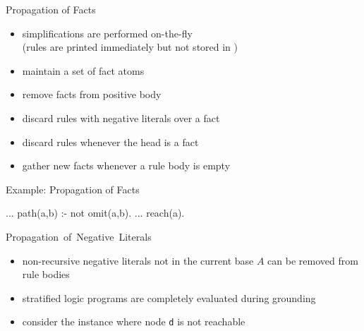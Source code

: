 \begin{frame}{Propagation of Facts}
  \vfill
  \begin{itemize}
    \item simplifications are performed \alert{on-the-fly}\\
      (rules are printed immediately but not stored in \gringo)
    \item maintain a set of \alert{fact atoms}
    \item remove facts from positive body
    \item discard rules with negative literals over a fact
    \item discard rules whenever the head is a fact
    \item gather new facts whenever a rule body is empty
  \end{itemize}
\end{frame}

\begin{frame}[fragile]{Example: Propagation of Facts}
  \vfill
  \begin{SemiVerbatim}{.9}
...
path(a,b) :- not omit(a,b).
...
reach(a). {}
\end{SemiVerbatim}
\end{frame}

\begin{frame}{\mbox{Propagation of Negative Literals}}
  \vfill
  \begin{itemize}
    \item \alert{non-recursive negative literals} not in the current base \(A\) can be removed from rule bodies
    \item \alert{stratified} logic programs are \alert{completely evaluated} during grounding
    \item consider the instance where node \texttt{d} is not reachable
  \end{itemize}
  \hspace{1em}
  \begin{center}
    \Graph[draw=none]
  \end{center}
\end{frame}


